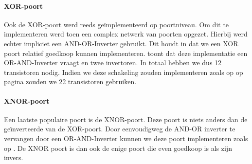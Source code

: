 \paragraph{XOR-poort}
Ook de XOR-poort werd reeds ge\"implementeerd op poortniveau. Om dit te implementeren werd toen een complex netwerk van poorten opgezet. Hierbij werd echter impliciet een AND-OR-Inverter gebruikt. Dit houdt in dat we een XOR poort relatief goedkoop kunnen implementeren.  toont dat deze implementatie een OR-AND-Inverter vraagt en twee invertoren. In totaal hebben we dus 12 transistoren nodig. Indien we deze schakeling zouden implementeren zoals op  op pagina \pageref{fig:complexGatesXor} zouden we 22 transistoren gebruiken.
\paragraph{XNOR-poort}
Een laatste populaire poort is de XNOR-poort. Deze poort is niets anders dan de ge\"inverteerde van de XOR-poort. Door eenvoudigweg de AND-OR inverter te vervangen door een OR-AND-Inverter kunnen we deze poort implementeren zoals op . De XNOR poort is dan ook de enige poort die even goedkoop is als zijn invers.
